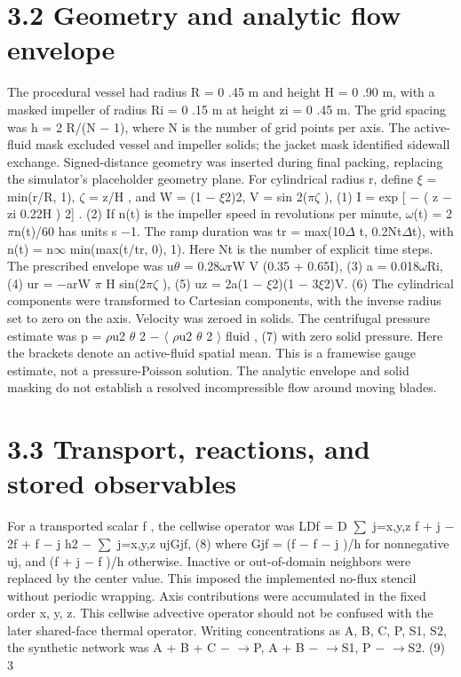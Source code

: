 \documentclass[11pt]{article}
\begin{document}
\section*{3.2 Geometry and analytic flow envelope}

The procedural vessel had radius R = 0 .45 m and height H = 0 .90 m, with a masked impeller
of radius Ri = 0 .15 m at height zi = 0 .45 m. The grid spacing was h = 2 R/(N \ensuremath{-} 1), where N
is the number of grid points per axis. The active-fluid mask excluded vessel and impeller solids;
the jacket mask identified sidewall exchange. Signed-distance geometry was inserted during final
packing, replacing the simulator’s placeholder geometry plane.
For cylindrical radius r, define \ensuremath{\xi} = min(r/R, 1), \ensuremath{\zeta} = z/H , and
W = (1 \ensuremath{-} \ensuremath{\xi}2)2, V = sin 2(\ensuremath{\pi}\ensuremath{\zeta} ), (1)
I = exp
[
\ensuremath{-}
( z \ensuremath{-} zi
0.22H
) 2]
. (2)
If n(t) is the impeller speed in revolutions per minute, \ensuremath{\omega}(t) = 2 \ensuremath{\pi}n(t)/60 has units s \ensuremath{-}1. The
ramp duration was tr = max(10\ensuremath{\Delta} t, 0.2Nt\ensuremath{\Delta}t), with n(t) = n\ensuremath{\infty} min(max(t/tr, 0), 1). Here Nt is the
number of explicit time steps. The prescribed envelope was
u\ensuremath{\theta} = 0.28\ensuremath{\omega}rW V (0.35 + 0.65I), (3)
a = 0.018\ensuremath{\omega}Ri, (4)
ur = \ensuremath{-}arW \ensuremath{\pi}
H sin(2\ensuremath{\pi}\ensuremath{\zeta} ), (5)
uz = 2a(1 \ensuremath{-} \ensuremath{\xi}2)(1 \ensuremath{-} 3\ensuremath{\xi}2)V. (6)
The cylindrical components were transformed to Cartesian components, with the inverse radius set
to zero on the axis. Velocity was zeroed in solids. The centrifugal pressure estimate was
p = \ensuremath{\rho}u2
\ensuremath{\theta}
2 \ensuremath{-}
\ensuremath{\langle} \ensuremath{\rho}u2
\ensuremath{\theta}
2
\ensuremath{\rangle}
fluid
, (7)
with zero solid pressure. Here the brackets denote an active-fluid spatial mean. This is a framewise
gauge estimate, not a pressure-Poisson solution. The analytic envelope and solid masking do not
establish a resolved incompressible flow around moving blades.

\section*{3.3 Transport, reactions, and stored observables}

For a transported scalar f , the cellwise operator was
LDf = D
\ensuremath{\sum}
j=x,y,z
f +
j \ensuremath{-} 2f + f \ensuremath{-}
j
h2 \ensuremath{-}
\ensuremath{\sum}
j=x,y,z
ujGjf, (8)
where Gjf = (f \ensuremath{-} f \ensuremath{-}
j )/h for nonnegative uj, and (f +
j \ensuremath{-} f )/h otherwise. Inactive or out-of-domain
neighbors were replaced by the center value. This imposed the implemented no-flux stencil without
periodic wrapping. Axis contributions were accumulated in the fixed order x, y, z. This cellwise
advective operator should not be confused with the later shared-face thermal operator.
Writing concentrations as A, B, C, P, S1, S2, the synthetic network was
A + B + C \ensuremath{-} \ensuremath{\to}P, A + B \ensuremath{-} \ensuremath{\to}S1, P \ensuremath{-} \ensuremath{\to}S2. (9)
3
\end{document}
